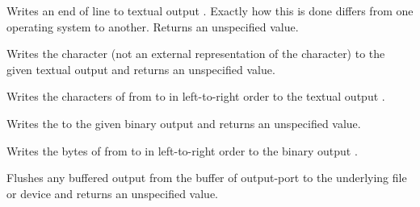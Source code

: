 \begin{entry}{%
}

Writes an end of line to textual output .  Exactly how this
is done differs
from one operating system to another.  Returns an unspecified value.

\end{entry}


\begin{entry}{%
}

Writes the character  (not an external representation of the
character) to the given textual output  and returns an unspecified
value.  

\end{entry}

\begin{entry}{%
}

Writes the characters of 
from  to 
in left-to-right order to the
textual output .

\end{entry}

\begin{entry}{%
}

Writes the  to
the given binary output  and returns an unspecified value.

\end{entry}

\begin{entry}{%
}

Writes the bytes of 
from  to 
in left-to-right order to the
binary output .

\end{entry}

\begin{entry}{%
}

Flushes any buffered output from the buffer of output-port to the
underlying file or device and returns an unspecified value.

\end{entry}



